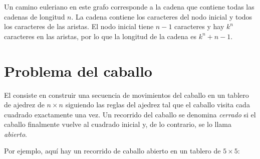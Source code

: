 \begin{center}
\end{center}

Un camino euleriano en este grafo corresponde a la cadena que contiene
todas las cadenas de longitud $n$. La cadena contiene los caracteres
del nodo inicial y todos los caracteres de las aristas. El nodo inicial
tiene $n-1$ caracteres y hay $k^n$ caracteres en las aristas, por lo que
la longitud de la cadena es $k^n+n-1$.

\section{Problema del caballo}


El  consiste en construir una secuencia de
movimientos del caballo en un tablero de ajedrez de $n \times n$
siguiendo las reglas del ajedrez tal que el caballo visita cada cuadrado
exactamente una vez. Un recorrido del caballo se denomina \emph{cerrado}
si el caballo finalmente vuelve al cuadrado inicial y, de lo contrario,
se lo llama \emph{abierto}.

Por ejemplo, aquí hay un recorrido de caballo abierto en un
tablero de $5 \times 5$:

